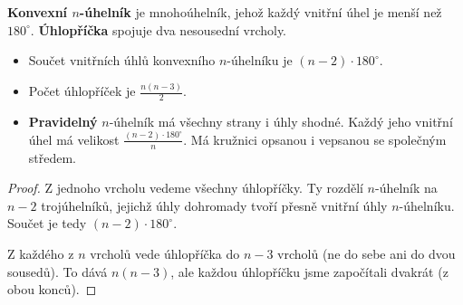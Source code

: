 \begin{definitionbox}
  \textbf{Konvexní $n$-úhelník} je mnohoúhelník, jehož každý vnitřní úhel je menší než $180^\circ$. \textbf{Úhlopříčka} spojuje dva nesousední vrcholy.
  \begin{itemize}
    \item Součet vnitřních úhlů konvexního $n$-úhelníku je $(n - 2)\cdot 180^\circ$.
    \item Počet úhlopříček je $\frac{n(n - 3)}{2}$.
    \item \textbf{Pravidelný} $n$-úhelník má všechny strany i úhly shodné. Každý jeho vnitřní úhel má velikost $\frac{(n - 2)\cdot 180^\circ}{n}$. Má kružnici opsanou i vepsanou se společným středem.
  \end{itemize}
\end{definitionbox}

\begin{proof}
  Z jednoho vrcholu vedeme všechny úhlopříčky. Ty rozdělí $n$-úhelník na $n - 2$ trojúhelníků, jejichž úhly dohromady tvoří přesně vnitřní úhly $n$-úhelníku. Součet je tedy $(n - 2)\cdot 180^\circ$.

  Z každého z $n$ vrcholů vede úhlopříčka do $n - 3$ vrcholů (ne do sebe ani do dvou sousedů). To dává $n(n - 3)$, ale každou úhlopříčku jsme započítali dvakrát (z obou konců).
\end{proof}

\begin{center}
  \hspace{1.2cm}
\end{center}

